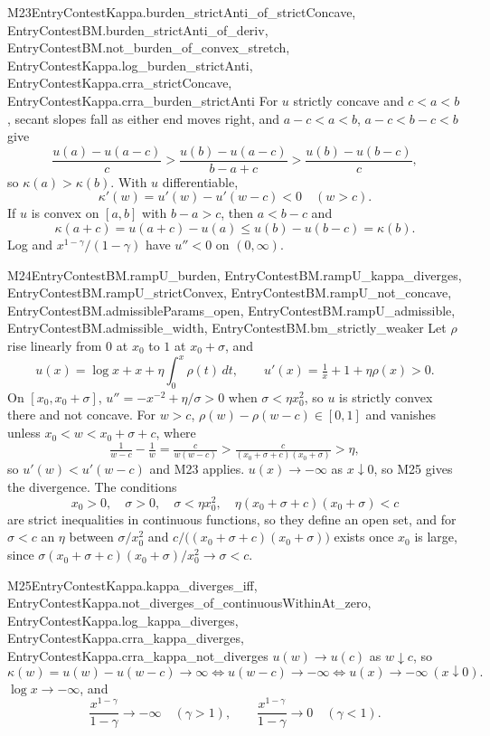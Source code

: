 \begin{mproof}{M23}{EntryContestKappa.burden_strictAnti_of_strictConcave, EntryContestBM.burden_strictAnti_of_deriv, EntryContestBM.not_burden_of_convex_stretch, EntryContestKappa.log_burden_strictAnti, EntryContestKappa.crra_strictConcave, EntryContestKappa.crra_burden_strictAnti}
For $u$ strictly concave and $c<a<b$, secant slopes fall as either end moves
right, and $a-c<a<b$, $a-c<b-c<b$ give
\[
  \frac{u(a)-u(a-c)}{c}>\frac{u(b)-u(a-c)}{b-a+c}>\frac{u(b)-u(b-c)}{c},
\]
so $\kappa(a)>\kappa(b)$. With $u$ differentiable,
\[
  \kappa'(w)=u'(w)-u'(w-c)<0\quad(w>c).
\]
If $u$ is convex on $[a,b]$ with $b-a>c$, then $a<b-c$ and
\[
  \kappa(a+c)=u(a+c)-u(a)\le u(b)-u(b-c)=\kappa(b).
\]
Log and $x^{1-\gamma}/(1-\gamma)$ have $u''<0$ on $(0,\infty)$.
\end{mproof}

\begin{mproof}{M24}{EntryContestBM.rampU_burden, EntryContestBM.rampU_kappa_diverges, EntryContestBM.rampU_strictConvex, EntryContestBM.rampU_not_concave, EntryContestBM.admissibleParams_open, EntryContestBM.rampU_admissible, EntryContestBM.admissible_width, EntryContestBM.bm_strictly_weaker}
Let $\rho$ rise linearly from $0$ at $x_0$ to $1$ at $x_0+\sigma$, and
\[
  u(x)=\log x+x+\eta\int_0^x\rho(t)\,dt,\qquad u'(x)=\tfrac1x+1+\eta\rho(x)>0 .
\]
On $[x_0,x_0+\sigma]$, $u''=-x^{-2}+\eta/\sigma>0$ when $\sigma<\eta x_0^2$, so $u$
is strictly convex there and not concave. For $w>c$, $\rho(w)-\rho(w-c)\in[0,1]$
and vanishes unless $x_0<w<x_0+\sigma+c$, where
\[
  \tfrac1{w-c}-\tfrac1w=\tfrac c{w(w-c)}>\tfrac c{(x_0+\sigma+c)(x_0+\sigma)}>\eta ,
\]
so $u'(w)<u'(w-c)$ and M23 applies. $u(x)\to-\infty$ as $x\downarrow0$, so M25
gives the divergence. The conditions
\[
  x_0>0,\quad \sigma>0,\quad \sigma<\eta x_0^2,\quad \eta(x_0+\sigma+c)(x_0+\sigma)<c
\]
are strict inequalities in continuous functions, so they define an open set,
and for $\sigma<c$ an $\eta$ between $\sigma/x_0^2$ and
$c/\big((x_0+\sigma+c)(x_0+\sigma)\big)$ exists once $x_0$ is large, since
$\sigma(x_0+\sigma+c)(x_0+\sigma)/x_0^2\to\sigma<c$.
\end{mproof}

\begin{mproof}{M25}{EntryContestKappa.kappa_diverges_iff, EntryContestKappa.not_diverges_of_continuousWithinAt_zero, EntryContestKappa.log_kappa_diverges, EntryContestKappa.crra_kappa_diverges, EntryContestKappa.crra_kappa_not_diverges}
$u(w)\to u(c)$ as $w\downarrow c$, so
\[
  \kappa(w)=u(w)-u(w-c)\to\infty\iff u(w-c)\to-\infty\iff u(x)\to-\infty\ (x\downarrow0).
\]
$\log x\to-\infty$, and
\[
  \frac{x^{1-\gamma}}{1-\gamma}\to-\infty\quad(\gamma>1),\qquad
  \frac{x^{1-\gamma}}{1-\gamma}\to0\quad(\gamma<1).
\]
\end{mproof}

